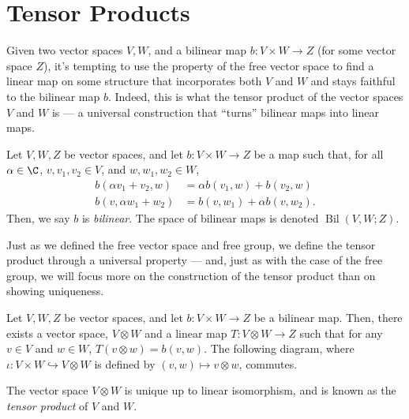 \section{Tensor Products}%
Given two vector spaces $V,W$, and a bilinear map $b\colon V\times W \rightarrow Z$ (for some vector space $Z$), it's tempting to use the property of the free vector space to find a linear map on some structure that incorporates both $V$ and $W$ and stays faithful to the bilinear map $b$. Indeed, this is what the tensor product of the vector spaces $V$ and $W$ is --- a universal construction that ``turns'' bilinear maps into linear maps.
\begin{definition}\label{def:bilinear_map}
  Let $V,W,Z$ be vector spaces, and let $b\colon V\times W\rightarrow Z$ be a map such that, for all $\alpha\in \C$, $v,v_1,v_2\in V$, and $w,w_1,w_2\in W$,
  \begin{align*}
    b\left( \alpha v_1 + v_2,w \right) &= \alpha b\left( v_1,w \right) + b\left( v_2,w \right)\\
    b\left( v,\alpha w_1 + w_2 \right) &= b\left( v,w_1 \right) + \alpha b\left( v,w_2 \right).
  \end{align*}
  Then, we say $b$ is \textit{bilinear}. The space of bilinear maps is denoted $\operatorname{Bil}\left( V,W;Z \right)$.
\end{definition}
Just as we defined the free vector space and free group, we define the tensor product through a universal property --- and, just as with the case of the free group, we will focus more on the construction of the tensor product than on showing uniqueness.
\begin{theorem}\label{thm:tensor_product_existence}
  Let $V,W,Z$ be vector spaces, and let $b\colon V\times W \rightarrow Z$ be a bilinear map. Then, there exists a vector space, $V\otimes W$ and a linear map $T\colon V\otimes W \rightarrow Z$ such that for any $v\in V$ and $w\in W$, $T\left( v\otimes w \right) = b\left( v,w \right)$. The following diagram, where $\iota\colon V\times W \hookrightarrow V\otimes W$ is defined by $\left( v,w \right)\mapsto v\otimes w$, commutes.
  \begin{center}
  \end{center}
  The vector space $V\otimes W$ is unique up to linear isomorphism, and is known as the \textit{tensor product} of $V$ and $W$.
\end{theorem}
